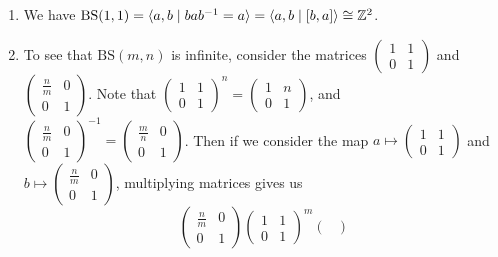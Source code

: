 \begin{ex}
    \begin{enumerate}[label=(\arabic*)]
    \setlength\itemsep{-.2em}
\item We have $\mathrm{BS}(1,1)=\langle  a,b\mid bab ^{-1} = a\rangle =\langle a,b \mid [b,a] \rangle \cong \mathbb{Z}^2$.
\item To see that $\mathrm{BS}(m,n)$ is infinite, consider the matrices $\left( 
    \begin{smallmatrix}
        1 & 1 \\ 0 & 1
\end{smallmatrix}\right) $ and $\left( 
\begin{smallmatrix}
    \frac{n}{m} & 0 \\ 0 & 1
\end{smallmatrix}\right) $. Note that $\left( 
    \begin{smallmatrix}
        1 & 1 \\ 0 & 1
\end{smallmatrix}\right) ^n =\left( 
    \begin{smallmatrix}
        1 & n \\ 0 & 1
\end{smallmatrix}\right) $, and $\left( 
\begin{smallmatrix}
    \frac{n}{m} & 0 \\ 0 & 1
\end{smallmatrix}\right) ^{-1}=\left( 
\begin{smallmatrix}
    \frac{m}{n} & 0 \\ 0 & 1
\end{smallmatrix}\right) $.
Then if we consider the map $a \mapsto \left( 
    \begin{smallmatrix}
        1 & 1 \\ 0 & 1
\end{smallmatrix}\right) $ and $b\mapsto \left( 
\begin{smallmatrix}
    \frac{n}{m} & 0 \\ 0 & 1
\end{smallmatrix}\right) $, multiplying matrices gives us \[
\begin{pmatrix}
    \frac{n}{m} & 0 \\ 0 & 1
\end{pmatrix} 
\begin{pmatrix}
    1 & 1 \\ 0 & 1
\end{pmatrix}^m 
\begin{pmatrix}

\end{pmatrix}\]
\end{enumerate}
\end{ex}
